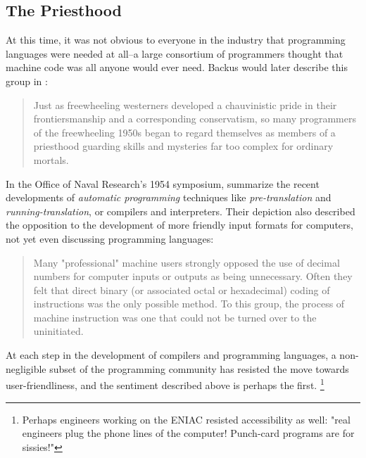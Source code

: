 
\subsection{The Priesthood}
\label{sec:backus_priesthood}

At this time, it was not obvious to everyone in the industry that
programming languages were needed at all--a large consortium of programmers
thought that machine code was all anyone would ever need.
Backus would later describe this group in :

\begin{quotation}
	Just as freewheeling westerners developed a chauvinistic pride in their frontiersmanship
	and a corresponding conservatism, so many programmers of the freewheeling 1950s
	began to regard themselves as members of a priesthood guarding skills and
	mysteries far too complex for ordinary mortals.
	\cite{Backus_1980_Programming_in_America_in_1950s}
\end{quotation}

In the Office of Naval Research's 1954 symposium,
\citeauthor{brown_carr_automatic_onr_symposium_1954} summarize the recent developments
of \textit{automatic programming} techniques like \textit{pre-translation} and \textit{running-translation},
or compilers and interpreters.
Their depiction also described the opposition to the development of more friendly
input formats for computers, not yet even discussing programming languages:

\begin{quotation}
	Many "professional" machine users strongly opposed the use of decimal
	numbers for computer inputs or outputs as being unnecessary. Often they felt
	that direct binary (or associated octal or hexadecimal) coding of instructions
	was the only possible method. To this group, the process of machine instruction
	was one that could not be turned over to the uninitiated.
	\cite{brown_carr_automatic_onr_symposium_1954}
\end{quotation}

At each step in the development of compilers and programming languages,
a non-negligible subset of the programming community has resisted the move
towards user-friendliness, and the sentiment \citeauthor{brown_carr_automatic_onr_symposium_1954}
described above is perhaps the first.
\footnote{
	Perhaps engineers working on the ENIAC resisted accessibility as well:
	"real engineers plug the phone lines of the computer! Punch-card programs are for sissies!"
}

